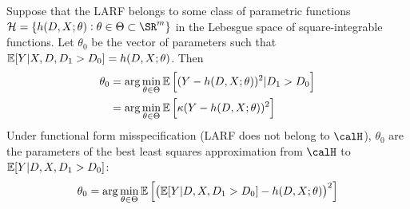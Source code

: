 Suppose that the LARF belongs to some class of parametric functions $\mathcal{H} = \{h(D,X;\theta): \theta \in \Theta \subset \SR^m\}$ in the Lebesgue space of square-integrable functions. Let $\theta_0$ be the vector of parameters such that $\mathbb{E}[Y|X,D,D_1> D_0] = h(D,X;\theta)$. Then
\begin{equation}
	\label{eq:abdaie-5}
	\begin{split}
		\theta_0 &= \arg\min_{\theta \in \Theta} \mathbb{E}\left[(Y-h(D,X;\theta))^2|D_1 > D_0\right] \\
		&= \arg\min_{\theta\in\Theta}\mathbb{E}\left[\kappa(Y-h(D,X;\theta))^2\right]
	\end{split}
\end{equation}
Under functional form misspecification (LARF does not belong to $\calH$), $\theta_0$ are the parameters of the best least squares approximation from $\calH$ to $\mathbb{E}[Y|D,X,D_1 > D_0]$:
\begin{equation*}
	\theta_0 = \arg\min_{\theta\in\Theta} \mathbb{E}\left[\left(\mathbb{E}[Y|D,X,D_1 > D_0] - h(D,X;\theta)\right)^2\right]
\end{equation*}









